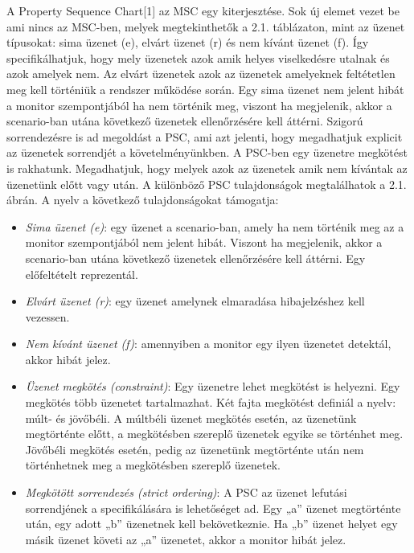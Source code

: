 A Property Sequence Chart[1] az MSC egy kiterjesztése.
Sok új elemet vezet be ami nincs az MSC-ben, melyek megtekinthetők a 2.1. táblázaton, mint az üzenet típusokat: sima üzenet (e), elvárt üzenet (r) és nem kívánt üzenet (f).
Így specifikálhatjuk, hogy mely üzenetek azok amik helyes viselkedésre utalnak és azok amelyek nem.
Az elvárt üzenetek azok az üzenetek amelyeknek feltétetlen meg kell történiük a rendszer működése során.
Egy sima üzenet nem jelent hibát a monitor szempontjából ha nem történik meg, viszont ha megjelenik, akkor a scenario-ban utána következő üzenetek ellenőrzésére kell áttérni.
Szigorú sorrendezésre is ad megoldást a PSC, ami azt jelenti, hogy megadhatjuk explicit az üzenetek sorrendjét a követelményünkben.
A PSC-ben egy üzenetre megkötést is rakhatunk.
Megadhatjuk, hogy melyek azok az üzenetek amik nem kívántak az üzenetünk előtt vagy után.
A különböző PSC tulajdonságok megtalálhatok a 2.1. ábrán.
A nyelv a következő tulajdonságokat támogatja:

\begin{itemize}
    \item \textit{Sima üzenet (e)}: egy üzenet a scenario-ban, amely ha nem történik meg az a monitor szempontjából nem jelent hibát.
    Viszont ha megjelenik, akkor a scenario-ban utána következő üzenetek ellenőrzésére kell áttérni.
    Egy előfeltételt reprezentál.
    \item \textit{Elvárt üzenet (r)}: egy üzenet amelynek elmaradása hibajelzéshez kell vezessen.
    \item \textit{Nem kívánt üzenet (f)}: amennyiben a monitor egy ilyen üzenetet detektál, akkor hibát jelez.
    \item \textit{Üzenet megkötés (constraint)}: Egy üzenetre lehet megkötést is helyezni.
    Egy megkötés több üzenetet tartalmazhat.
    Két fajta megkötést definiál a nyelv: múlt- és jövőbéli.
    A múltbéli üzenet megkötés esetén, az üzenetünk megtörténte előtt, a megkötésben szereplő üzenetek egyike se történhet meg.
    Jövőbéli megkötés esetén, pedig az üzenetünk megtörténte után nem történhetnek meg a megkötésben szereplő üzenetek.
    \item \textit{Megkötött sorrendezés (strict ordering)}: A PSC az üzenet lefutási sorrendjének a specifikálására is lehetőséget ad.
    Egy „a” üzenet megtörténte után, egy adott „b” üzenetnek kell bekövetkeznie.
    Ha „b” üzenet helyet egy másik üzenet követi az „a” üzenetet, akkor a monitor hibát jelez.
\end{itemize}

